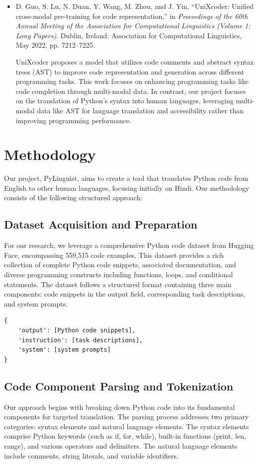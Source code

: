 \documentclass[9pt]{papertex}
\begin{document}
\begin{itemize}
        \item D. Guo, S. Lu, N. Duan, Y. Wang, M. Zhou, and J. Yin, “UniXcoder: Unified cross-modal pre-training for code representation,” in \textit{Proceedings of the 60th Annual Meeting of the Association for Computational Linguistics (Volume 1: Long Papers)}. Dublin, Ireland: Association for Computational Linguistics, May 2022, pp. 7212–7225.
        
        UniXcoder proposes a model that utilizes code comments and abstract syntax trees (AST) to improve code representation and generation across different programming tasks. This work focuses on enhancing programming tasks like code completion through multi-modal data. In contrast, our project focuses on the translation of Python's syntax into human languages, leveraging multi-modal data like AST for language translation and accessibility rather than improving programming performance.
    \end{itemize}

\section{Methodology}

Our project, PyLinguist, aims to create a tool that translates Python code from English to other human languages, focusing initially on Hindi. Our methodology consists of the following structured approach:
\subsection{Dataset Acquisition and Preparation}
For our research, we leverage a comprehensive Python code dataset from Hugging Face, encompassing 559,515 code examples. This dataset provides a rich collection of complete Python code snippets, associated documentation, and diverse programming constructs including functions, loops, and conditional statements. The dataset follows a structured format containing three main components: code snippets in the output field, corresponding task descriptions, and system prompts.

\begin{lstlisting}
{
    'output': [Python code snippets],
    'instruction': [task descriptions],
    'system': [system prompts]
}
\end{lstlisting}

\subsection{Code Component Parsing and Tokenization}
Our approach begins with breaking down Python code into its fundamental components for targeted translation. The parsing process addresses two primary categories: syntax elements and natural language elements. The syntax elements comprise Python keywords (such as if, for, while), built-in functions (print, len, range), and various operators and delimiters. The natural language elements include comments, string literals, and variable identifiers.
\end{document}
